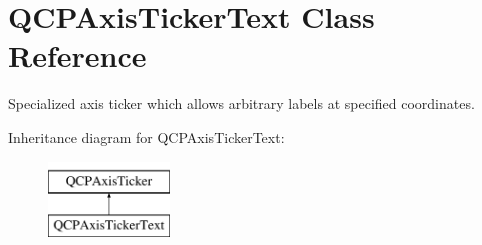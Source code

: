 \hypertarget{class_q_c_p_axis_ticker_text}{}\section{Q\+C\+P\+Axis\+Ticker\+Text Class Reference}
\label{class_q_c_p_axis_ticker_text}


Specialized axis ticker which allows arbitrary labels at specified coordinates.  


Inheritance diagram for Q\+C\+P\+Axis\+Ticker\+Text\+:\begin{figure}[H]
\begin{center}
\leavevmode
\includegraphics[height=2.000000cm]{class_q_c_p_axis_ticker_text}
\end{center}
\end{figure}
